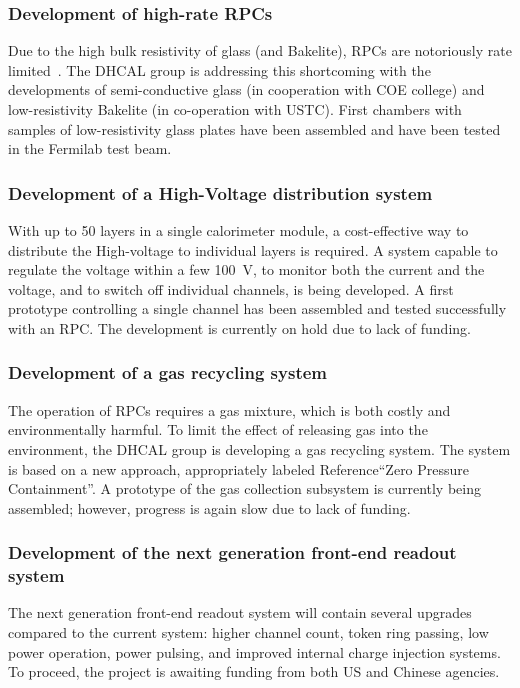 \subsubsection{Development of high-rate RPCs}
Due to the high bulk resistivity of glass (and Bakelite), RPCs are notoriously rate limited~\cite{Bilki:2013:CAN42}. The DHCAL group is addressing this shortcoming with the developments of semi-conductive glass (in cooperation with COE college) and low-resistivity Bakelite (in co-operation with USTC). First chambers with samples of low-resistivity glass plates have been assembled and have been tested in the Fermilab test beam.
\subsubsection{Development of a High-Voltage distribution system}
With up to 50 layers in a single calorimeter module, a cost-effective way to distribute the High-voltage to individual layers is required. A system capable to regulate the voltage within a few \SI{100}{V}, to monitor both the current and the voltage, and to switch off individual channels, is being developed. A first prototype controlling a single channel has been assembled and tested successfully with an RPC. The development is currently on hold due to lack of funding.
\subsubsection{Development of a gas recycling system}
The operation of RPCs requires a gas mixture, which is both costly and environmentally harmful. To limit the effect of releasing gas into the environment, the DHCAL group is developing a gas recycling system. The system is based on a new approach, appropriately labeled {\color{red}Reference}``Zero Pressure Containment''. A prototype of the gas collection subsystem is currently being assembled; however, progress is again slow due to lack of funding.
\subsubsection{Development of the next generation front-end readout system}
The next generation front-end readout system will contain several upgrades compared to the current system: higher channel count, token ring passing, low power operation, power pulsing, and improved internal charge injection systems. To proceed, the project is awaiting funding from both US and Chinese agencies.

